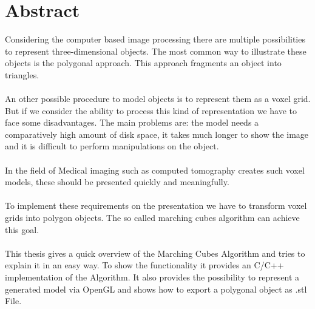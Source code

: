 \chapter{Abstract}

Considering the computer based image processing there are multiple possibilities to represent three-dimensional objects. The most common way to illustrate these objects is the polygonal approach. This approach fragments an object into triangles.
\\\\
An other possible procedure to model objects is to represent them as a voxel grid. But if we consider the ability to process this kind of representation we have to face some disadvantages. The main problems are: the model needs a comparatively high amount of disk space, it takes much longer to show the image and it is difficult to perform manipulations on the object.
\\\\
In the field of Medical imaging such as computed tomography creates such voxel models, these should be presented quickly and meaningfully.
\\\\
To implement these requirements on the presentation we have to transform voxel grids into polygon objects. The so called marching cubes algorithm can achieve this goal.
\\\\
This thesis gives a quick overview of the Marching Cubes Algorithm and tries to explain it in an easy way. To show the functionality it provides an C/C++ implementation of the Algorithm. It also provides the possibility to represent a generated model via OpenGL and shows how to export a polygonal object as .stl File.